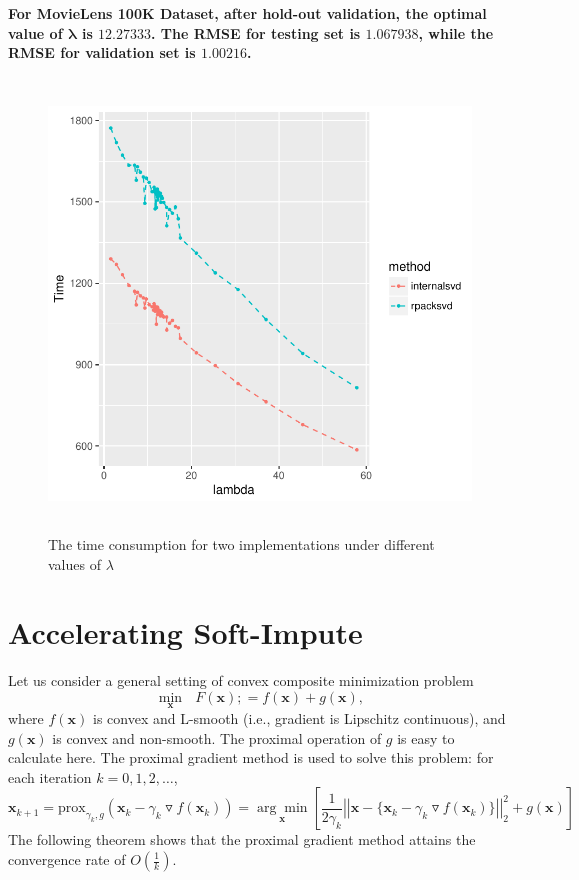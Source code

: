 \documentclass[12pt]{article}
\begin{document}
{\bf For MovieLens 100K Dataset, after hold-out validation, the optimal value of $\bm{\lambda}$ is $\mathbf{12.27333}$. The RMSE for testing set is $\mathbf{1.067938}$, while the RMSE for validation set is $\mathbf{1.00216}$.}


\begin{figure}[H]
	\includegraphics[width=18cm,height=12cm]{speed}
	\caption{The time consumption for two implementations under different values of $\lambda$}\label{speed}
\end{figure}

\vspace{0.2in}
\section{Accelerating \textbf{Soft-Impute}}
Let us consider a general setting of convex composite minimization problem
\begin{equation*}
\underset{\bm{x}}{\min}\text{ }F(\bm{x}) ;= f(\bm{x}) + g(\bm{x}),
\end{equation*}
where $f(\bm{x})$ is convex and L-smooth (i.e., gradient is Lipschitz continuous), and  $g(\bm{x})$ is convex and non-smooth. The proximal operation of $g$ is easy to calculate here.  The proximal gradient method \cite{bruck1975iterative} is used to solve this problem: for each iteration $k = 0,1,2,\ldots$,
\begin{equation*}
\bm{x}_{k+1} = \text{prox}_{\gamma_{k}, g}(\bm{x}_{k}-\gamma_{k}\triangledown f(\bm{x}_{k})) = 
\underset{\bm{x}}{\arg\min}\left[\frac{1}{2\gamma_{k}}\left|\left|\bm{x} - \{\bm{x}_{k}-\gamma_{k}\triangledown f(\bm{x}_{k})\}\right|\right|^{2}_{2}+g(\bm{x})\right]
\end{equation*}
The following theorem shows that the proximal gradient method attains the convergence rate of $O\left(\frac{1}{k}\right)$.
\end{document}
